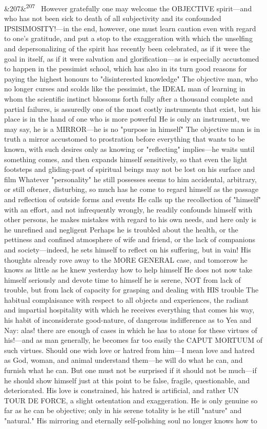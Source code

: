 \documentclass[12pt]{article}
\newcommand{\para}[1][]{\par\noindent\ifx&#1&\else\textsuperscript{\footnotesize #1}~\fi}
\begin{document}
\para[207] However gratefully one may welcome the OBJECTIVE spirit---and who has not been sick to death of all subjectivity and its confounded IPSISIMOSITY!---in the end, however, one must learn caution even with regard to one's gratitude, and put a stop to the exaggeration with which the unselfing and depersonalizing of the spirit has recently been celebrated, as if it were the goal in itself, as if it were salvation and glorification---as is especially accustomed to happen in the pessimist school, which has also in its turn good reasons for paying the highest honours to "disinterested knowledge" The objective man, who no longer curses and scolds like the pessimist, the IDEAL man of learning in whom the scientific instinct blossoms forth fully after a thousand complete and partial failures, is assuredly one of the most costly instruments that exist, but his place is in the hand of one who is more powerful He is only an instrument, we may say, he is a MIRROR---he is no "purpose in himself" The objective man is in truth a mirror accustomed to prostration before everything that wants to be known, with such desires only as knowing or "reflecting" implies---he waits until something comes, and then expands himself sensitively, so that even the light footsteps and gliding-past of spiritual beings may not be lost on his surface and film Whatever "personality" he still possesses seems to him accidental, arbitrary, or still oftener, disturbing, so much has he come to regard himself as the passage and reflection of outside forms and events He calls up the recollection of "himself" with an effort, and not infrequently wrongly, he readily confounds himself with other persons, he makes mistakes with regard to his own needs, and here only is he unrefined and negligent Perhaps he is troubled about the health, or the pettiness and confined atmosphere of wife and friend, or the lack of companions and society---indeed, he sets himself to reflect on his suffering, but in vain! His thoughts already rove away to the MORE GENERAL case, and tomorrow he knows as little as he knew yesterday how to help himself He does not now take himself seriously and devote time to himself he is serene, NOT from lack of trouble, but from lack of capacity for grasping and dealing with HIS trouble The habitual complaisance with respect to all objects and experiences, the radiant and impartial hospitality with which he receives everything that comes his way, his habit of inconsiderate good-nature, of dangerous indifference as to Yea and Nay: alas! there are enough of cases in which he has to atone for these virtues of his!---and as man generally, he becomes far too easily the CAPUT MORTUUM of such virtues. Should one wish love or hatred from him---I mean love and hatred as God, woman, and animal understand them---he will do what he can, and furnish what he can. But one must not be surprised if it should not be much---if he should show himself just at this point to be false, fragile, questionable, and deteriorated. His love is constrained, his hatred is artificial, and rather UN TOUR DE FORCE, a slight ostentation and exaggeration. He is only genuine so far as he can be objective; only in his serene totality is he still "nature" and "natural." His mirroring and eternally self-polishing soul no longer knows how to 
\end{document}
